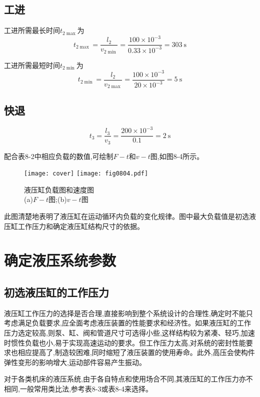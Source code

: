 \subsection{工进}
工进所需最长时间$t_{2\max}$为
$$t_{2\max}=\frac{l_2}{v_{2\min}}=\frac{100\times10^{-3}}{0.33\times 10^{-3}}=303\ \text{s}$$

工进所需最短时间$t_{2\min}$为
$$t_{2\min}=\frac{l_2}{v_{2\max}}=\frac{100\times10^{-3}}{20\times 10^{-3}}=5\ \text{s}$$

\subsection{快退}
$$t_3=\frac{l_3}{v_3}=\frac{200\times10^{-3}}{0.1}=2\ \text{s}$$

配合表8-2中相应负载的数值,可绘制$F-t$和$v-t$图,如图8-4所示。

\begin{figure}
    \centering
    \ifOpenSource
    \texttt{[image: cover]}
    \else
    \texttt{[image: fig0804.pdf]}
    \fi
    \caption{液压缸负载图和速度图\\(a)$F-t$图;(b)$v-t$图}
    \label{fig:fig0804}
\end{figure}

此图清楚地表明了液压缸在运动循环内负载的变化规律。图中最大负载值是初选液压缸工作压力和确定液压缸结构尺寸的依据。

\section{确定液压系统参数}
\subsection{初选液压缸的工作压力}
液压缸工作压力的选择是否合理,直接影响到整个系统设计的合理性,确定时不能只考虑满足负载要求,应全面考虑液压装置的性能要求和经济性。如果液压缸的工作压力选定较高,则泵、缸、阀和管道尺寸可选得小些,这样结构较为紧凑、轻巧,加速时惯性负载也小,易于实现高速运动的要求。但工作压力太高,对系统的密封性能要求也相应提高了,制造较困难,同时缩短了液压装置的使用寿命。此外,高压会使构件弹性变形的影响增大,运动部件容易产生振动。

对于各类机床的液压系统,由于各自特点和使用场合不同,其液压缸的工作压力亦不相同,一般常用类比法,参考表8-3或表8-4来选择。